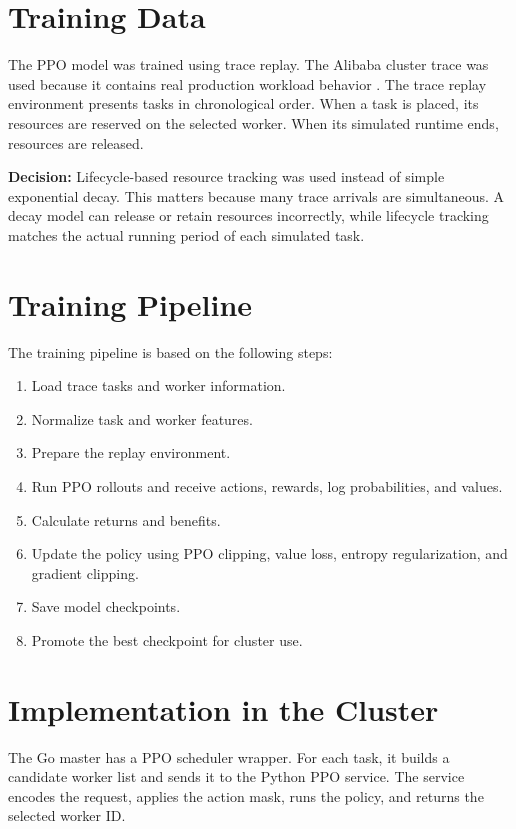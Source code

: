\section{Training Data}

The PPO model was trained using trace replay. The Alibaba cluster trace was used because it contains real production workload behavior \cite{alibabatrace}. The trace replay environment presents tasks in chronological order. When a task is placed, its resources are reserved on the selected worker. When its simulated runtime ends, resources are released.

\textbf{Decision:} Lifecycle-based resource tracking was used instead of simple exponential decay. This matters because many trace arrivals are simultaneous. A decay model can release or retain resources incorrectly, while lifecycle tracking matches the actual running period of each simulated task.

\section{Training Pipeline}

The training pipeline is based on the following steps:

\begin{enumerate}
    \item Load trace tasks and worker information.
    \item Normalize task and worker features.
    \item Prepare the replay environment.
    \item Run PPO rollouts and receive actions, rewards, log probabilities, and values.
    \item Calculate returns and benefits.
    \item Update the policy using PPO clipping, value loss, entropy regularization, and gradient clipping.
    \item Save model checkpoints.
    \item Promote the best checkpoint for cluster use.
\end{enumerate}

\section{Implementation in the Cluster}

The Go master has a PPO scheduler wrapper. For each task, it builds a candidate worker list and sends it to the Python PPO service. The service encodes the request, applies the action mask, runs the policy, and returns the selected worker ID.

